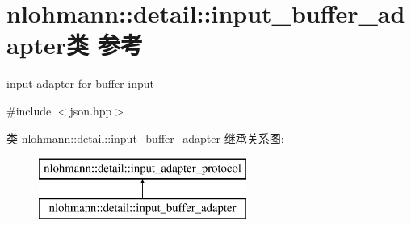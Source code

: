 \hypertarget{classnlohmann_1_1detail_1_1input__buffer__adapter}{}\section{nlohmann\+::detail\+::input\+\_\+buffer\+\_\+adapter类 参考}
\label{classnlohmann_1_1detail_1_1input__buffer__adapter}


input adapter for buffer input  




{\ttfamily \#include $<$json.\+hpp$>$}

类 nlohmann\+::detail\+::input\+\_\+buffer\+\_\+adapter 继承关系图\+:\begin{figure}[H]
\begin{center}
\leavevmode
\includegraphics[height=2.000000cm]{classnlohmann_1_1detail_1_1input__buffer__adapter}
\end{center}
\end{figure}

